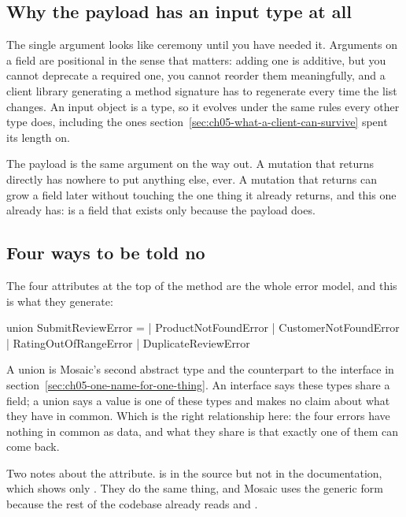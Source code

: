 \subsection*{Why the payload has an input type at all}

%
The single  argument looks like ceremony until you have needed it.
Arguments on a field are positional in the sense that matters: adding one is
additive, but you cannot deprecate a required one, you cannot reorder them
meaningfully, and a client library generating a method signature has to
regenerate every time the list changes. An input object is a type, so it evolves
under the same rules every other type does, including the ones
section~\ref{sec:ch05-what-a-client-can-survive} spent its length on.

The payload is the same argument on the way out. A mutation that returns
 directly has nowhere to put anything else, ever. A mutation that
returns  can grow a field later without touching the
one thing it already returns, and this one already has:  is a field
that exists only because the payload does.

\subsection*{Four ways to be told no}

%
The four attributes at the top of the method are the whole error model, and this
is what they generate:

\begin{graphqlsdl}
union SubmitReviewError =
  | ProductNotFoundError
  | CustomerNotFoundError
  | RatingOutOfRangeError
  | DuplicateReviewError
\end{graphqlsdl}

A union is Mosaic's second abstract type and the counterpart to the interface in
section~\ref{sec:ch05-one-name-for-one-thing}. An interface says these types
share a field; a union says a value is one of these types and makes no claim
about what they have in common. Which is the right relationship here: the four
errors have nothing in common as data, and what they share is that exactly one
of them can come back.

%
Two notes about the attribute. \code{[Error<T>]} is in the source but not in the
documentation, which shows only . They do the same
thing, and Mosaic uses the generic form because the rest of the codebase already
reads \code{[ObjectType<T>]} and \code{[QueryType]}.

